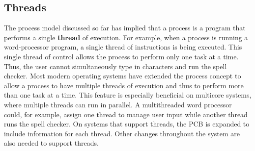 \subsection*{Threads}
The process model discussed so far has implied that a process is a program that performs a single \textbf{thread} of execution. For example, when a process is running a word-processor program, a single thread of instructions is being executed. This single thread of control allows the process to perform only one task at a time. Thus, the user cannot simultaneously type in characters and run the spell checker. Most modern operating systems have extended the process concept to allow a process to have multiple threads of execution and thus to perform more than one task at a time. This feature is especially beneficial on multicore systems, where multiple threads can run in parallel. A multithreaded word processor could, for example, assign one thread to manage user input while another thread runs the spell checker. On systems that support threads, the PCB is expanded to include information for each thread. Other changes throughout the system are also needed to support threads.

